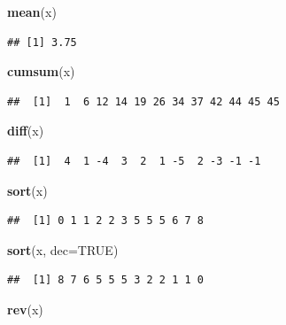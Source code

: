 \documentclass[]{book}
\newenvironment{Shaded}{\begin{snugshade}}{\end{snugshade}}
\newcommand{\DataTypeTok}[1]{\textcolor[rgb]{0.13,0.29,0.53}{#1}}
\newcommand{\KeywordTok}[1]{\textcolor[rgb]{0.13,0.29,0.53}{\textbf{#1}}}
\newcommand{\NormalTok}[1]{#1}
\newcommand{\OtherTok}[1]{\textcolor[rgb]{0.56,0.35,0.01}{#1}}
\theoremstyle{definition}
\theoremstyle{definition}
\theoremstyle{definition}
\theoremstyle{remark}
\begin{document}
\begin{Shaded}
\begin{Highlighting}[]
\KeywordTok{mean}\NormalTok{(x)}
\end{Highlighting}
\end{Shaded}

\begin{verbatim}
## [1] 3.75
\end{verbatim}

\begin{Shaded}
\begin{Highlighting}[]
\KeywordTok{cumsum}\NormalTok{(x)}
\end{Highlighting}
\end{Shaded}

\begin{verbatim}
##  [1]  1  6 12 14 19 26 34 37 42 44 45 45
\end{verbatim}

\begin{Shaded}
\begin{Highlighting}[]
\KeywordTok{diff}\NormalTok{(x)}
\end{Highlighting}
\end{Shaded}

\begin{verbatim}
##  [1]  4  1 -4  3  2  1 -5  2 -3 -1 -1
\end{verbatim}

\begin{Shaded}
\begin{Highlighting}[]
\KeywordTok{sort}\NormalTok{(x)}
\end{Highlighting}
\end{Shaded}

\begin{verbatim}
##  [1] 0 1 1 2 2 3 5 5 5 6 7 8
\end{verbatim}

\begin{Shaded}
\begin{Highlighting}[]
\KeywordTok{sort}\NormalTok{(x, }\DataTypeTok{dec=}\OtherTok{TRUE}\NormalTok{)}
\end{Highlighting}
\end{Shaded}

\begin{verbatim}
##  [1] 8 7 6 5 5 5 3 2 2 1 1 0
\end{verbatim}

\begin{Shaded}
\begin{Highlighting}[]
\KeywordTok{rev}\NormalTok{(x)}
\end{Highlighting}
\end{Shaded}
\end{document}
